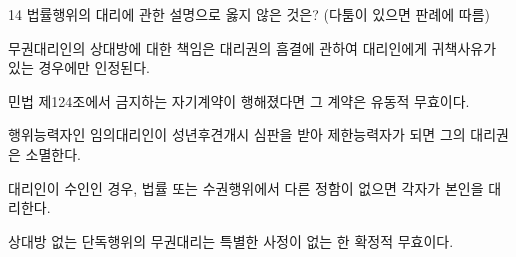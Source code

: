 \begin{question}{14}
법률행위의 대리에 관한 설명으로 옳지 않은 것은? (다툼이 있으면 판례에 따름)
\begin{choices}
  \item 무권대리인의 상대방에 대한 책임은 대리권의 흠결에 관하여 대리인에게 귀책사유가 있는 경우에만 인정된다.
  \item 민법 제124조에서 금지하는 자기계약이 행해졌다면 그 계약은 유동적 무효이다.
  \item 행위능력자인 임의대리인이 성년후견개시 심판을 받아 제한능력자가 되면 그의 대리권은 소멸한다.
  \item 대리인이 수인인 경우, 법률 또는 수권행위에서 다른 정함이 없으면 각자가 본인을 대리한다.
  \item 상대방 없는 단독행위의 무권대리는 특별한 사정이 없는 한 확정적 무효이다.
\end{choices}
\end{question}
